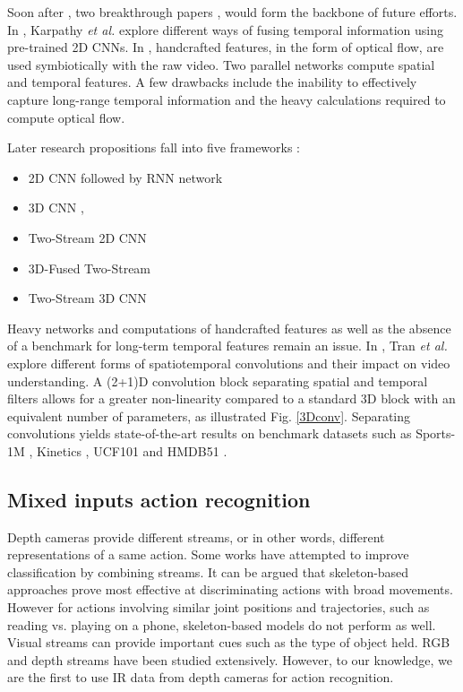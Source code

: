 \documentclass[letterpaper, 10 pt, conference]{ieeeconf}
\begin{document}
Soon after \cite{wang2013action}, two breakthrough papers \cite{karpathy2014large}, \cite{simonyan2014two} would form the backbone of future efforts. In \cite{karpathy2014large}, Karpathy \textit{et al.} explore different ways of fusing temporal information using pre-trained 2D CNNs. In \cite{simonyan2014two}, handcrafted features, in the form of optical flow, are used symbiotically with the raw video. Two parallel networks compute spatial and temporal features. A few drawbacks include the inability to effectively capture long-range temporal information and the heavy calculations required to compute optical flow. 

Later research propositions fall into five frameworks :
\begin{itemize}
    \item 2D CNN followed by RNN network \cite{donahue2015long}
    \item 3D CNN \cite{tran2015learning}, \cite{yao2015describing}
    \item Two-Stream 2D CNN \cite{feichtenhofer2016convolutional}
    \item 3D-Fused Two-Stream \cite{feichtenhofer2016convolutional}
    \item Two-Stream 3D CNN \cite{carreira2017quo}
\end{itemize}

Heavy networks and computations of handcrafted features as well as the absence of a benchmark for long-term temporal features remain an issue. In \cite{tran2018closer}, Tran \textit{et al.} explore different forms of spatiotemporal convolutions and their impact on video understanding. A (2+1)D convolution block separating spatial and temporal filters allows for a greater non-linearity compared to a standard 3D block with an equivalent number of parameters, as illustrated Fig. \ref{3Dconv}. Separating convolutions yields state-of-the-art results on benchmark datasets such as Sports-1M \cite{karpathy2014large}, Kinetics \cite{carreira2017quo}, UCF101 \cite{soomro2012ucf101} and HMDB51 \cite{kuehne2011hmdb}. 

\subsection{Mixed inputs action recognition}

Depth cameras provide different streams, or in other words, different representations of a same action. Some works have attempted to improve classification by combining streams. It can be argued that skeleton-based approaches prove most effective at discriminating actions with broad movements. However for actions involving similar joint positions and trajectories, such as reading vs. playing on a phone, skeleton-based models do not perform as well. Visual streams can provide important cues such as the type of object held. RGB and depth streams have been studied extensively. However, to our knowledge, we are the first to use IR data from depth cameras for action recognition.
\end{document}
